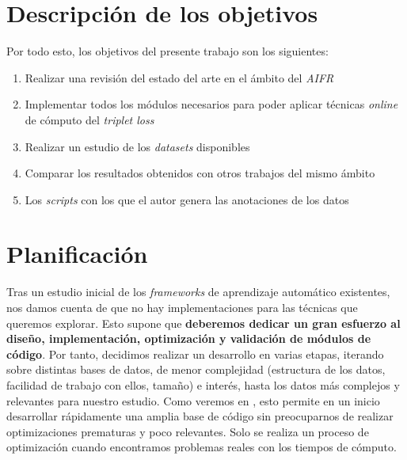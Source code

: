 
\section{Descripción de los objetivos}

Por todo esto, los objetivos del presente trabajo son los siguientes:

\begin{enumerate}
    \item Realizar una revisión del estado del arte en el ámbito del \textit{AIFR}
    \item Implementar todos los módulos necesarios para poder aplicar técnicas \textit{online} de cómputo del \textit{triplet loss}
    \item Realizar un estudio de los \textit{datasets} disponibles
    \item Comparar los resultados obtenidos con otros trabajos del mismo ámbito
    \item Los \textit{scripts} con los que el autor genera las anotaciones de los datos
\end{enumerate}

\section{Planificación} \label{isec:planificacion}

Tras un estudio inicial de los \textit{frameworks} de aprendizaje automático existentes, nos damos cuenta de que no hay implementaciones para las técnicas que queremos explorar. Esto supone que \textbf{deberemos dedicar un gran esfuerzo al diseño, implementación, optimización y validación de módulos de código}. Por tanto, decidimos realizar un desarrollo en varias etapas, iterando sobre distintas bases de datos, de menor complejidad (estructura de los datos, facilidad de trabajo con ellos, tamaño) e interés, hasta los datos más complejos y relevantes para nuestro estudio. Como veremos en , esto permite en un inicio desarrollar rápidamente una amplia base de código sin preocuparnos de realizar optimizaciones prematuras y poco relevantes. Solo se realiza un proceso de optimización cuando encontramos problemas reales con los tiempos de cómputo.

